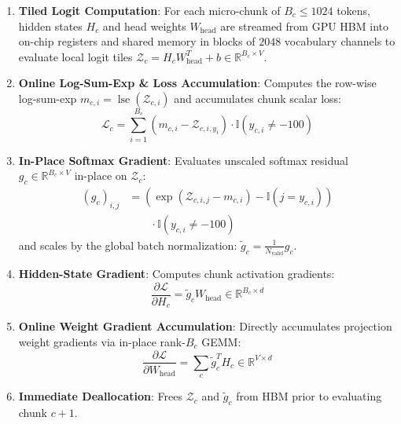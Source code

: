 \documentclass[10pt,twocolumn,letterpaper]{article}
\begin{document}
\begin{enumerate}
    \item \textbf{Tiled Logit Computation}: For each micro-chunk of $B_c \le 1024$ tokens, hidden states $H_c$ and head weights $W_{\text{head}}$ are streamed from GPU HBM into on-chip registers and shared memory in blocks of $2048$ vocabulary channels to evaluate local logit tiles $\mathcal{Z}_c = H_c W_{\text{head}}^T + b \in \mathbb{R}^{B_c \times V}$.
    \item \textbf{Online Log-Sum-Exp \& Loss Accumulation}: Computes the row-wise log-sum-exp $m_{c, i} = \operatorname{lse}(\mathcal{Z}_{c, i})$ and accumulates chunk scalar loss:
    \begin{equation}
        \mathcal{L}_c = \sum_{i=1}^{B_c} (m_{c, i} - \mathcal{Z}_{c, i, y_i}) \cdot \mathbb{I}(y_{c, i} \neq -100)
    \end{equation}
    \item \textbf{In-Place Softmax Gradient}: Evaluates unscaled softmax residual $g_c \in \mathbb{R}^{B_c \times V}$ in-place on $\mathcal{Z}_c$:
    \begin{equation}
    \begin{aligned}
        (g_c)_{i, j} &= \left( \exp(\mathcal{Z}_{c, i, j} - m_{c, i}) - \mathbb{I}(j = y_{c, i}) \right) \\
        &\qquad \cdot \mathbb{I}(y_{c, i} \neq -100)
    \end{aligned}
    \end{equation}
    and scales by the global batch normalization: $\tilde{g}_c = \frac{1}{N_{\text{valid}}} g_c$.
    \item \textbf{Hidden-State Gradient}: Computes chunk activation gradients:
    \begin{equation}
        \frac{\partial \mathcal{L}}{\partial H_c} = \tilde{g}_c W_{\text{head}} \in \mathbb{R}^{B_c \times d}
    \end{equation}
    \item \textbf{Online Weight Gradient Accumulation}: Directly accumulates projection weight gradients via in-place rank-$B_c$ GEMM:
    \begin{equation}
        \frac{\partial \mathcal{L}}{\partial W_{\text{head}}} = \sum_{c} \tilde{g}_c^T H_c \in \mathbb{R}^{V \times d}
    \end{equation}
    \item \textbf{Immediate Deallocation}: Frees $\mathcal{Z}_c$ and $\tilde{g}_c$ from HBM prior to evaluating chunk $c+1$.
\end{enumerate}
\end{document}
